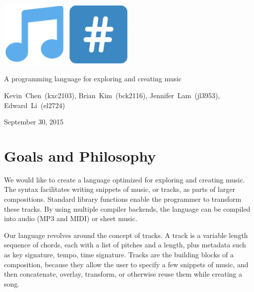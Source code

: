 \documentclass[11pt, onecolumn, letterpaper]{article}
\begin{document}

\begin{titlepage}

\centering

\includegraphics[width=0.5\textwidth]{note-hashtag.pdf} \par
\vspace{0.4em}
{\Large A programming language for exploring and creating music \par}
\vspace{1em}
\vfill
{\large Kevin~Chen~(kxc2103), Brian~Kim~(bck2116), Jennifer~Lam~(jl3953), Edward~Li~(el2724) \par}
\vspace{1em}
{\large September 30, 2015 \par}

\end{titlepage}

\raggedright
\setlength{\parskip}{1.3ex plus 0.5ex minus 0.3ex}

\setcounter{page}{2}


\section{Goals and Philosophy}
We would like to create a language optimized for exploring and creating music. The syntax facilitates writing snippets of music, or tracks, as parts of larger compositions. Standard library functions enable the programmer to transform these tracks. By using multiple compiler backends, the language can be compiled into audio (MP3 and MIDI) or sheet music.

Our language revolves around the concept of tracks. A track is a variable length sequence of chords, each with a list of pitches and a length, plus metadata such as key signature, tempo, time signature. Tracks are the building blocks of a composition, because they allow the user to specify a few snippets of music, and then concatenate, overlay, transform, or otherwise reuse them while creating a song. 
\end{document}
